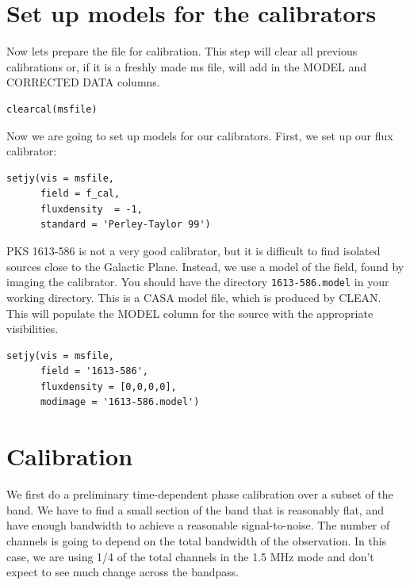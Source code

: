 \documentclass[force,almostfull,justified]{tufte-book}
\begin{document}
\section{Set up models for the calibrators}

Now lets prepare the file for calibration.  This step will clear all
previous calibrations or, if it is a freshly made ms file, will add in
the MODEL and CORRECTED DATA columns.

\begin{casacmd}
\begin{verbatim}
clearcal(msfile)
\end{verbatim}
\end{casacmd}

Now we are going to set up models for our calibrators.  First, we set up
our flux calibrator:

\begin{casacmd}
\begin{verbatim}
setjy(vis = msfile,
      field = f_cal,
      fluxdensity  = -1,
      standard = 'Perley-Taylor 99')
\end{verbatim}
\end{casacmd}

PKS 1613-586 is not a very good calibrator, but it is difficult to find
isolated sources close to the Galactic Plane.  Instead, we use a model
of the field, found by imaging the calibrator. You should have the
directory {\tt 1613-586.model} in your working directory.  This is a
CASA model file, which is produced by CLEAN.  This will populate the
MODEL column for the source with the appropriate visibilities.

\begin{casacmd}
\begin{verbatim}
setjy(vis = msfile,
      field = '1613-586',
      fluxdensity = [0,0,0,0],
      modimage = '1613-586.model')
\end{verbatim}
\end{casacmd}


\section{Calibration}

We first do a preliminary time-dependent phase calibration over a subset
of the band.  We have to find a small section of the band that is
reasonably flat, and have enough bandwidth to achieve a reasonable
signal-to-noise.  The number of channels is going to depend on the total
bandwidth of the observation.  In this case, we are using  1/4 of the
total channels in the 1.5 MHz mode and don't expect to see much change
across the bandpass.
\end{document}
